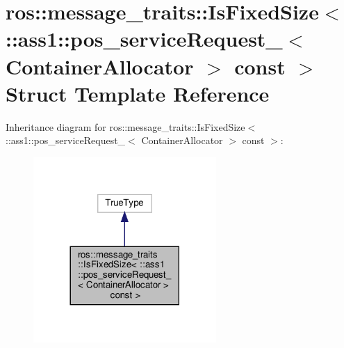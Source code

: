\hypertarget{structros_1_1message__traits_1_1IsFixedSize_3_01_1_1ass1_1_1pos__serviceRequest___3_01ContainerAllocator_01_4_01const_01_4}{}\section{ros\+:\+:message\+\_\+traits\+:\+:Is\+Fixed\+Size$<$ \+:\+:ass1\+:\+:pos\+\_\+service\+Request\+\_\+$<$ Container\+Allocator $>$ const $>$ Struct Template Reference}
\label{structros_1_1message__traits_1_1IsFixedSize_3_01_1_1ass1_1_1pos__serviceRequest___3_01ContainerAllocator_01_4_01const_01_4}


Inheritance diagram for ros\+:\+:message\+\_\+traits\+:\+:Is\+Fixed\+Size$<$ \+:\+:ass1\+:\+:pos\+\_\+service\+Request\+\_\+$<$ Container\+Allocator $>$ const $>$\+:
\nopagebreak
\begin{figure}[H]
\begin{center}
\leavevmode
\includegraphics[width=197pt]{structros_1_1message__traits_1_1IsFixedSize_3_01_1_1ass1_1_1pos__serviceRequest___3_01ContainerA87a3b1be0e53c9c1401578c04545bffa}
\end{center}
\end{figure}


